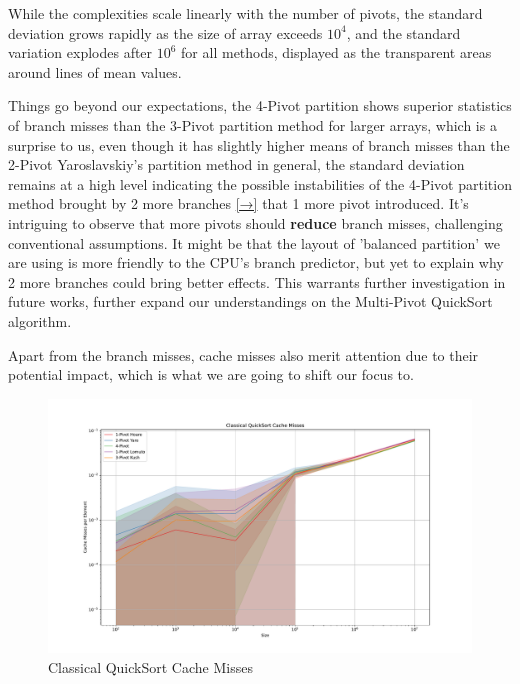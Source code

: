 \documentclass[a4paper,oneside,12pt]{book}
\begin{document}
While the complexities scale linearly with the number of pivots, the standard deviation grows rapidly as the size of array exceeds $10^4$, and the standard variation explodes after $10^6$ for all methods, displayed as the transparent areas around lines of mean values.

Things go beyond our expectations, the 4-Pivot partition shows superior statistics of branch misses than the 3-Pivot partition method for larger arrays, which is a surprise to us,
even though it has slightly higher means of branch misses than the 2-Pivot Yaroslavskiy's partition method in general, the standard deviation remains at a high level indicating
the possible instabilities of the 4-Pivot partition method brought by 2 more branches \hyperlink{2MoreBranches}{[→]} that 1 more pivot introduced. It's intriguing to observe that more pivots should \textbf{reduce} branch misses, challenging conventional assumptions.
It might be that the layout of 'balanced partition' we are using is more friendly to the CPU's branch predictor, but yet to explain why 2 more branches could bring better effects. This warrants further investigation in future works, further expand our understandings on the Multi-Pivot QuickSort algorithm. 

Apart from the branch misses, cache misses also merit attention due to their potential impact, which is what we are going to shift our focus to.

\begin{figure}[H]
    \hypertarget{fig:classicalcachemiss}{}
    \caption{Classical QuickSort Cache Misses}
    \centering
    \hspace*{-0.27\textwidth}
    \includegraphics[width=1.5\textwidth]{Classical QuickSort Cache Misses.pdf}
\end{figure}
\end{document}
